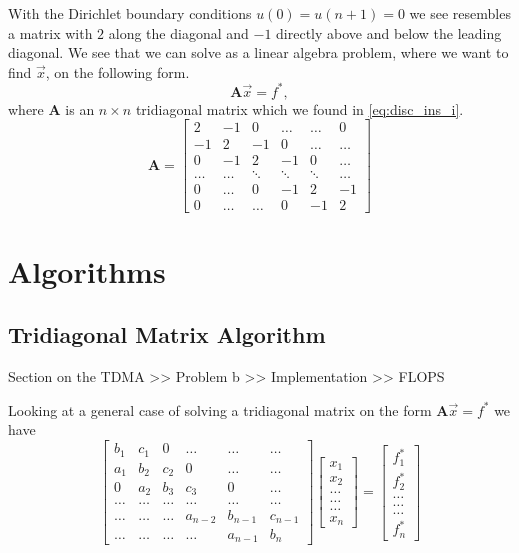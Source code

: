 \documentclass[10pt, a4paper]{amsart}
\begin{document}
With the Dirichlet boundary conditions $u(0) = u(n+1) = 0$ we see resembles a matrix with $2$ along the diagonal and $-1$ directly above and below the leading diagonal. We see that we can solve as a linear algebra problem, where we want to find $\vec{x}$, on the following form. 
\begin{equation}
\mathbf{A}\vec{x} = f^*, \nonumber
\end{equation}
where $\mathbf{A}$ is an $n\times n$ tridiagonal matrix which we found in \ref{eq:disc_ins_i}.
\begin{equation}
\mathbf{A} = 
\begin{bmatrix}
2 & -1 & 0 & \dots & \dots & 0 \\
-1 & 2 & -1 & 0 & \dots & \dots \\
0 & -1 & 2 & -1 & 0 & \dots \\
\dots & \dots & \ddots & \ddots & \ddots & \dots\\
0 & \dots & 0 & -1 & 2 & -1 \\
0 & \dots & \dots & 0 & -1 & 2
\end{bmatrix}
\end{equation}

\section{Algorithms} 
\subsection{Tridiagonal Matrix Algorithm}
Section on the TDMA
>> Problem b >> Implementation >> FLOPS

Looking at a general case of solving a tridiagonal matrix on the form $\mathbf{A}\vec{x} = f^*$ we have 
\begin{equation} 
	\begin{bmatrix}
		b_1 & c_1 & 0 &\dots &\dots &\dots \\
		a_1 & b_2 & c_2 & 0 &\dots &\dots\\
		0 & a_2 & b_3 & c_3 & 0 &\dots \\
		\dots &\dots &\dots &\dots &\dots &\dots\\
		\dots &\dots &\dots & a_{n-2} & b_{n-1} & c_{n-1} \\
		\dots &\dots &\dots &\dots &a_{n-1} & b_n
	\end{bmatrix}
	\begin{bmatrix}
		x_1 \\
		x_2 \\
		\dots \\
		\dots \\
		\dots \\
		x_n
	\end{bmatrix} 
	= 
	\begin{bmatrix}
		f^*_1\\
		f^*_2\\
		\dots \\
		\dots \\
		\dots \\
		f^*_n
	\end{bmatrix}
\end{equation}
\end{document}
